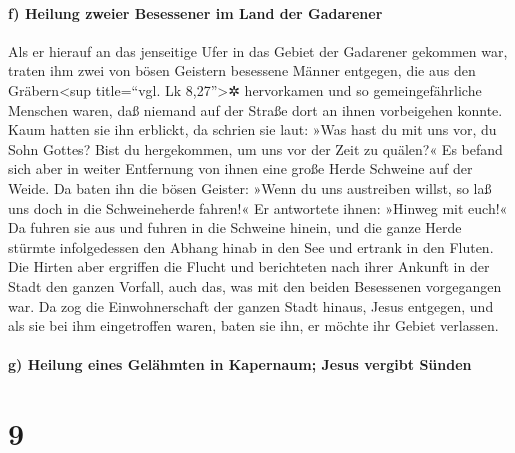 \hypertarget{f-heilung-zweier-besessener-im-land-der-gadarener}{%
\paragraph{f) Heilung zweier Besessener im Land der
Gadarener}\label{f-heilung-zweier-besessener-im-land-der-gadarener}}

 Als er hierauf an das jenseitige Ufer in das Gebiet der
Gadarener gekommen war, traten ihm zwei von bösen Geistern besessene
Männer entgegen, die aus den Gräbern\textless sup title=``vgl. Lk
8,27''\textgreater✲ hervorkamen und so gemeingefährliche Menschen waren,
daß niemand auf der Straße dort an ihnen vorbeigehen konnte.
 Kaum hatten sie ihn erblickt, da schrien sie laut: »Was
hast du mit uns vor, du Sohn Gottes? Bist du hergekommen, um uns vor der
Zeit zu quälen?«  Es befand sich aber in weiter
Entfernung von ihnen eine große Herde Schweine auf der Weide.
 Da baten ihn die bösen Geister: »Wenn du uns austreiben
willst, so laß uns doch in die Schweineherde fahren!«  Er
antwortete ihnen: »Hinweg mit euch!« Da fuhren sie aus und fuhren in die
Schweine hinein, und die ganze Herde stürmte infolgedessen den Abhang
hinab in den See und ertrank in den Fluten.  Die Hirten
aber ergriffen die Flucht und berichteten nach ihrer Ankunft in der
Stadt den ganzen Vorfall, auch das, was mit den beiden Besessenen
vorgegangen war.  Da zog die Einwohnerschaft der ganzen
Stadt hinaus, Jesus entgegen, und als sie bei ihm eingetroffen waren,
baten sie ihn, er möchte ihr Gebiet verlassen.

\hypertarget{g-heilung-eines-geluxe4hmten-in-kapernaum-jesus-vergibt-suxfcnden}{%
\paragraph{g) Heilung eines Gelähmten in Kapernaum; Jesus vergibt
Sünden}\label{g-heilung-eines-geluxe4hmten-in-kapernaum-jesus-vergibt-suxfcnden}}

\hypertarget{section-8}{%
\section{9}\label{section-8}}

